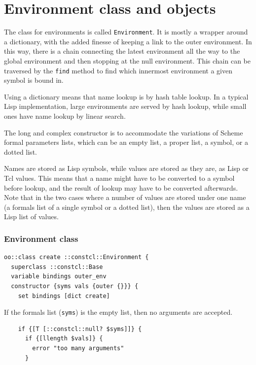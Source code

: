 \documentclass[a5paper,draft]{memoir}
\begin{document}
\chapter{Environment class and objects}
\label{environment-class-and-objects}

The class for environments is called \texttt{Environment}. It is mostly a wrapper around a dictionary, with the added finesse of keeping a link to the outer environment. In this way, there is a chain connecting the latest environment all the way to the global environment and then stopping at the null environment. This chain can be traversed by the \texttt{find} method to find which innermost environment a given symbol is bound in.

Using a dictionary means that name lookup is by hash table lookup. In a typical Lisp implementation, large environments are served by hash lookup, while small ones have name lookup by linear search.

The long and complex constructor is to accommodate the variations of Scheme formal parameters lists, which can be an empty list, a proper list, a symbol, or a dotted list.

Names are stored as Lisp symbols, while values are stored as they are, as Lisp or Tcl values. This means that a name might have to be converted to a symbol before lookup, and the result of lookup may have to be converted afterwards. Note that in the two cases where a number of values are stored under one name (a formals list of a single symbol or a dotted list), then the values are stored as a Lisp list of values.

\subsection{Environment class}
\label{environment-class}

\begin{lstlisting}
oo::class create ::constcl::Environment {
  superclass ::constcl::Base
  variable bindings outer_env
  constructor {syms vals {outer {}}} {
    set bindings [dict create]
\end{lstlisting}

If the formals list (\texttt{syms}) is the empty list, then no arguments are accepted.

\begin{lstlisting}
    if {[T [::constcl::null? $syms]]} {
      if {[llength $vals]} {
        error "too many arguments"
      }
\end{lstlisting}
\end{document}
